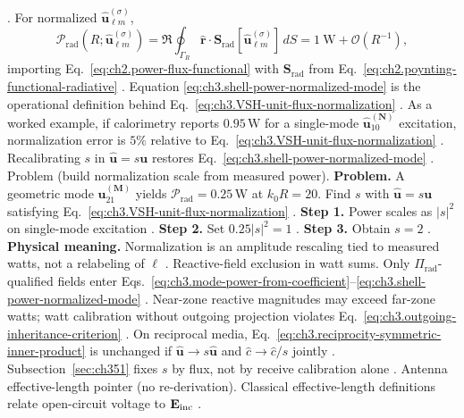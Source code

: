 \cite{harrington2001}.
For normalized \(\widehat{\mathbf{u}}_{\ell m}^{(\sigma)}\),
\begin{equation}
\label{eq:ch3.shell-power-normalized-mode}
\mathcal{P}_{\mathrm{rad}}(R;\widehat{\mathbf{u}}_{\ell m}^{(\sigma)})
=
\Re\oint_{\Gamma_R}\hat{\mathbf{r}}\cdot\mathbf{S}_{\mathrm{rad}}[\widehat{\mathbf{u}}_{\ell m}^{(\sigma)}]\,dS
=
1\ \mathrm{W}+\mathcal{O}(R^{-1}),
\end{equation}
importing Eq.~\eqref{eq:ch2.power-flux-functional} with \(\mathbf{S}_{\mathrm{rad}}\) from
Eq.~\eqref{eq:ch2.poynting-functional-radiative} \cite{poynting1884}. Equation
\eqref{eq:ch3.shell-power-normalized-mode} is the operational definition behind
Eq.~\eqref{eq:ch3.VSH-unit-flux-normalization} \cite{harrington2001}.
As a worked example, if calorimetry reports \(0.95\,\mathrm{W}\) for a single-mode \(\widehat{\mathbf{u}}_{10}^{(\mathbf{N})}\) excitation,
normalization error is \(5\%\) relative to Eq.~\eqref{eq:ch3.VSH-unit-flux-normalization} \cite{harrington2001}.
Recalibrating \(s\) in \(\widehat{\mathbf{u}}=s\mathbf{u}\) restores Eq.~\eqref{eq:ch3.shell-power-normalized-mode}
\cite{poynting1884}.
Problem (build normalization scale from measured power). \textbf{Problem.} A geometric mode \(\mathbf{u}_{21}^{(\mathbf{M})}\) yields \(\mathcal{P}_{\mathrm{rad}}=0.25\,\mathrm{W}\) at
\(k_{0}R=20\). Find \(s\) with \(\widehat{\mathbf{u}}=s\mathbf{u}\) satisfying Eq.~\eqref{eq:ch3.VSH-unit-flux-normalization}
\cite{harrington2001}.
\textbf{Step 1.} Power scales as \(|s|^{2}\) on single-mode excitation \cite{stratton1941}.
\textbf{Step 2.} Set \(0.25|s|^{2}=1\) \cite{poynting1884}.
\textbf{Step 3.} Obtain \(s=2\) \cite{hansen1988}.
\textbf{Physical meaning.} Normalization is an amplitude rescaling tied to measured watts, not a relabeling of \(\ell\)
\cite{harrington2001}.
Reactive-field exclusion in watt sums. Only \(\Pi_{\mathrm{rad}}\)-qualified fields enter Eqs.~\eqref{eq:ch3.mode-power-from-coefficient}--\eqref{eq:ch3.shell-power-normalized-mode}
\cite{harrington2001}. Near-zone reactive magnitudes may exceed far-zone watts; watt calibration without
outgoing projection violates Eq.~\eqref{eq:ch3.outgoing-inheritance-criterion} \cite{harrington2001}.
On reciprocal media, Eq.~\eqref{eq:ch3.reciprocity-symmetric-inner-product} is unchanged if
\(\widehat{\mathbf{u}}\to s\widehat{\mathbf{u}}\) and \(\widehat{c}\to\widehat{c}/s\) jointly
\cite{stratton1941}. Subsection~\ref{sec:ch351} fixes \(s\) by flux, not by receive calibration alone
\cite{harrington2001}.
Antenna effective-length pointer (no re-derivation). Classical effective-length definitions relate open-circuit voltage to \(\mathbf{E}_{\mathrm{inc}}\) \cite{harrington2001}.
